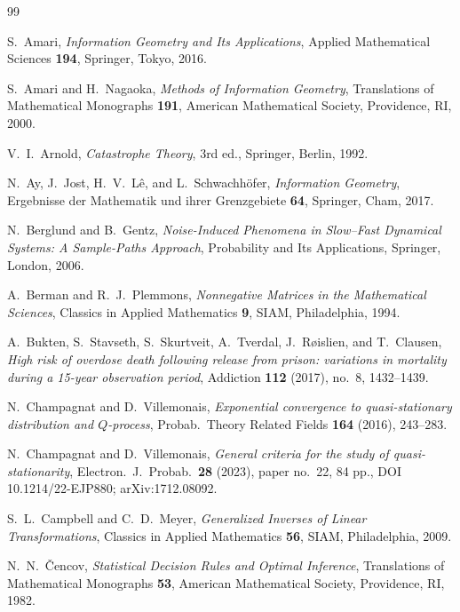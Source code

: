 \documentclass[11pt,reqno]{amsart}
\theoremstyle{plain}
\theoremstyle{definition}
\theoremstyle{remark}
\begin{document}
\begin{thebibliography}{99}

 S.~Amari, \emph{Information Geometry and Its Applications},
Applied Mathematical Sciences \textbf{194}, Springer, Tokyo, 2016.

 S.~Amari and H.~Nagaoka, \emph{Methods of Information
Geometry}, Translations of Mathematical Monographs \textbf{191}, American
Mathematical Society, Providence, RI, 2000.

 V.~I.~Arnold, \emph{Catastrophe Theory}, 3rd ed., Springer,
Berlin, 1992.

 N.~Ay, J.~Jost, H.~V.~L\^e, and L.~Schwachh\"ofer,
\emph{Information Geometry}, Ergebnisse der Mathematik und ihrer Grenzgebiete
\textbf{64}, Springer, Cham, 2017.

 N.~Berglund and B.~Gentz, \emph{Noise-Induced
Phenomena in Slow--Fast Dynamical Systems: A Sample-Paths Approach}, Probability and
Its Applications, Springer, London, 2006.

 A.~Berman and R.~J.~Plemmons, \emph{Nonnegative
Matrices in the Mathematical Sciences}, Classics in Applied Mathematics \textbf{9},
SIAM, Philadelphia, 1994.

 A.~Bukten, S.~Stavseth, S.~Skurtveit, A.~Tverdal,
J.~R\o{}islien, and T.~Clausen, \emph{High risk of overdose death following release
from prison: variations in mortality during a 15-year observation period}, Addiction
\textbf{112} (2017), no.~8, 1432--1439.

 N.~Champagnat and D.~Villemonais,
\emph{Exponential convergence to quasi-stationary distribution and $Q$-process},
Probab.\ Theory Related Fields \textbf{164} (2016), 243--283.

 N.~Champagnat and D.~Villemonais,
\emph{General criteria for the study of quasi-stationarity}, Electron.\ J.\ Probab.\
\textbf{28} (2023), paper no.~22, 84 pp., DOI 10.1214/22-EJP880; arXiv:1712.08092.

 S.~L.~Campbell and C.~D.~Meyer, \emph{Generalized
Inverses of Linear Transformations}, Classics in Applied Mathematics \textbf{56},
SIAM, Philadelphia, 2009.

 N.~N.~\v{C}encov, \emph{Statistical Decision Rules and Optimal
Inference}, Translations of Mathematical Monographs \textbf{53}, American
Mathematical Society, Providence, RI, 1982.


\end{thebibliography}
\end{document}
